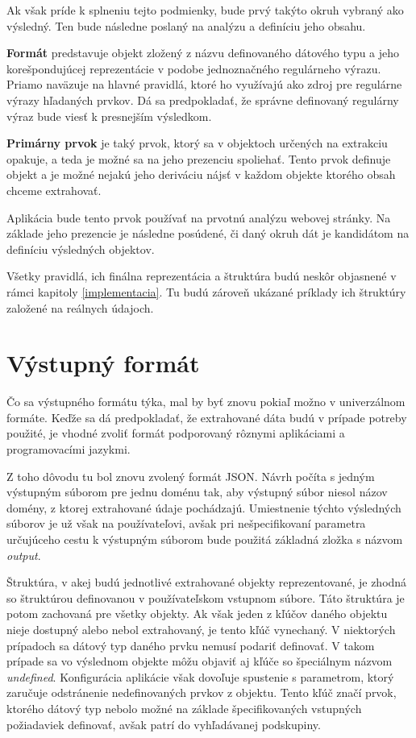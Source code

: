 Ak však príde k splneniu tejto podmienky, bude prvý takýto okruh vybraný ako výsledný. Ten bude následne poslaný na analýzu a definíciu jeho obsahu. 

\bigskip

\textbf{Formát} predstavuje objekt zložený z názvu definovaného dátového typu a jeho korešpondujúcej reprezentácie v podobe jednoznačného regulárneho výrazu. Priamo naväzuje na hlavné pravidlá, ktoré ho využívajú ako zdroj pre regulárne výrazy hľadaných prvkov. Dá sa predpokladať, že správne definovaný regulárny výraz bude viesť k presnejším výsledkom. 

\bigskip

\textbf{Primárny prvok} je taký prvok, ktorý sa v objektoch určených na extrakciu opakuje, a teda je možné sa na jeho prezenciu spoliehať. Tento prvok definuje objekt a je možné nejakú jeho deriváciu nájsť v každom objekte ktorého obsah chceme extrahovať. 

Aplikácia bude tento prvok používať na prvotnú analýzu webovej stránky. Na základe jeho prezencie je následne posúdené, či daný okruh dát je kandidátom na definíciu výsledných objektov.

\bigskip
\bigskip

Všetky pravidlá, ich finálna reprezentácia a štruktúra budú neskôr objasnené v rámci kapitoly \ref{implementacia}. Tu budú zároveň ukázané príklady ich štruktúry založené na reálnych údajoch.

\newpage

\section{Výstupný formát}

Čo sa výstupného formátu týka, mal by byť znovu pokiaľ možno v univerzálnom formáte. Keďže sa dá predpokladať, že extrahované dáta budú v prípade potreby použité, je vhodné zvoliť formát podporovaný rôznymi aplikáciami a programovacími jazykmi.

Z toho dôvodu tu bol znovu zvolený formát JSON. Návrh počíta s jedným výstupným súborom pre jednu doménu tak, aby výstupný súbor niesol názov domény, z ktorej extrahované údaje pochádzajú. Umiestnenie týchto výsledných súborov je už však na používateľovi, avšak pri nešpecifikovaní parametra určujúceho cestu k výstupným súborom bude použitá základná zložka s názvom \textit{output}.

\bigskip

Štruktúra, v akej budú jednotlivé extrahované objekty reprezentované, je zhodná so štruktúrou definovanou v používateľskom vstupnom súbore. Táto štruktúra je potom zachovaná pre všetky objekty. Ak však jeden z kľúčov daného objektu nieje dostupný alebo nebol extrahovaný, je tento kľúč vynechaný. V niektorých prípadoch sa dátový typ daného prvku nemusí podariť definovať. V takom prípade sa vo výslednom objekte môžu objaviť aj kľúče so špeciálnym názvom \textit{undefined}. Konfigurácia aplikácie však dovoľuje spustenie s parametrom, ktorý zaručuje odstránenie nedefinovaných prvkov z objektu. Tento kľúč značí prvok, ktorého dátový typ nebolo možné na základe špecifikovaných vstupných požiadaviek definovať, avšak patrí do vyhľadávanej podskupiny.

